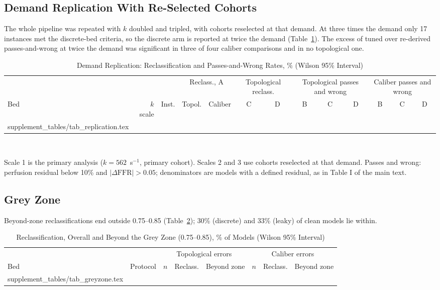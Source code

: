 \documentclass[journal,twoside,web,onecolumn]{ieeecolor}
\begin{document}
\subsection{Demand Replication With Re-Selected Cohorts}\label{sec:replication}
The whole pipeline was repeated with $k$ doubled and tripled, with cohorts reselected at that demand. At three times
the demand only 17 instances met the discrete-bed criteria, so the discrete arm is reported at twice the demand
(Table~\ref{tab:repl}). The excess of tuned over re-derived passes-and-wrong at twice the demand was significant in
three of four caliber comparisons and in no topological one.
\begin{table}[!ht]
\caption{Demand Replication: Reclassification and Passes-and-Wrong Rates, \% (Wilson 95\% Interval)}\label{tab:repl}
\centering\footnotesize\setlength{\tabcolsep}{3pt}
\begin{tabular}{@{}lrrcccccccccc@{}}
\toprule
 & & & \multicolumn{2}{c}{Reclass., A} & \multicolumn{2}{c}{Topological reclass.} & \multicolumn{3}{c}{Topological passes and wrong} & \multicolumn{3}{c}{Caliber passes and wrong}\\
\cmidrule(lr){4-5}\cmidrule(lr){6-7}\cmidrule(lr){8-10}\cmidrule(l){11-13}
Bed & $k$ scale & Inst. & Topol. & Caliber & C & D & B & C & D & B & C & D\\
\midrule
{} supplement_tables/tab_replication.tex 
\bottomrule
\end{tabular}
\\[3pt]
\parbox{0.95\textwidth}{\footnotesize Scale 1 is the primary analysis ($k = 562$~s$^{-1}$, primary cohort). Scales 2 and 3 use
cohorts reselected at that demand. Passes and wrong: perfusion residual below 10\% and $|\Delta\mathrm{FFR}| > 0.05$;
denominators are models with a defined residual, as in Table I of the main text.}
\end{table}

\FloatBarrier
{}
\subsection{Grey Zone}\label{sec:grey}
Beyond-zone reclassifications end outside 0.75--0.85 (Table~\ref{tab:grey}); 30\% (discrete) and 33\% (leaky) of clean models lie within.
\begin{table}[!ht]
\caption{Reclassification, Overall and Beyond the Grey Zone (0.75--0.85), \% of Models (Wilson 95\% Interval)}\label{tab:grey}
\centering\footnotesize
\begin{tabular}{@{}llrccrcc@{}}
\toprule
 & & \multicolumn{3}{c}{Topological errors} & \multicolumn{3}{c}{Caliber errors}\\
\cmidrule(lr){3-5}\cmidrule(l){6-8}
Bed & Protocol & $n$ & Reclass. & Beyond zone & $n$ & Reclass. & Beyond zone\\
\midrule
{} supplement_tables/tab_greyzone.tex 
\bottomrule
\end{tabular}
\end{table}
\end{document}
